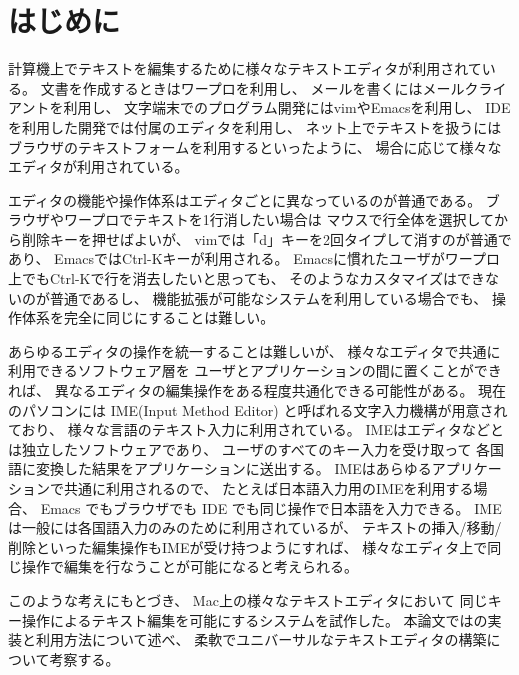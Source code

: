 \section{はじめに}

計算機上でテキストを編集するために様々なテキストエディタが利用されている。
文書を作成するときはワープロを利用し、
メールを書くにはメールクライアントを利用し、
文字端末でのプログラム開発にはvimやEmacsを利用し、
IDEを利用した開発では付属のエディタを利用し、
ネット上でテキストを扱うにはブラウザのテキストフォームを利用するといったように、
場合に応じて様々なエディタが利用されている。

エディタの機能や操作体系はエディタごとに異なっているのが普通である。
ブラウザやワープロでテキストを1行消したい場合は
マウスで行全体を選択してから削除キーを押せばよいが、
vimでは「d」キーを2回タイプして消すのが普通であり、
EmacsではCtrl-Kキーが利用される。
Emacsに慣れたユーザがワープロ上でもCtrl-Kで行を消去したいと思っても、
そのようなカスタマイズはできないのが普通であるし、
機能拡張が可能なシステムを利用している場合でも、
操作体系を完全に同じにすることは難しい。

あらゆるエディタの操作を統一することは難しいが、
様々なエディタで共通に利用できるソフトウェア層を
ユーザとアプリケーションの間に置くことができれば、
異なるエディタの編集操作をある程度共通化できる可能性がある。
%
現在のパソコンには IME(Input Method Editor) と呼ばれる文字入力機構が用意されており、
様々な言語のテキスト入力に利用されている。
IMEはエディタなどとは独立したソフトウェアであり、
ユーザのすべてのキー入力を受け取って
各国語に変換した結果をアプリケーションに送出する。
IMEはあらゆるアプリケーションで共通に利用されるので、
たとえば日本語入力用のIMEを利用する場合、
Emacs でもブラウザでも IDE でも同じ操作で日本語を入力できる。
IMEは一般には各国語入力のみのために利用されているが、
テキストの挿入/移動/削除といった編集操作もIMEが受け持つようにすれば、
様々なエディタ上で同じ操作で編集を行なうことが可能になると考えられる。

このような考えにもとづき、
Mac上の様々なテキストエディタにおいて
同じキー操作によるテキスト編集を可能にする{\system}システムを試作した。
本論文では{\system}の実装と利用方法について述べ、
柔軟でユニバーサルなテキストエディタの構築について考察する。
